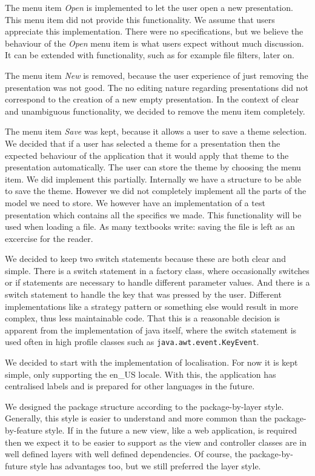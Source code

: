 \documentclass[a4paper]{article}
\begin{document}
The menu item \textit{Open} is implemented to let the user open a new presentation. This menu item did not provide this functionality. We assume that users appreciate this implementation. There were no specifications, but we believe the behaviour of the \textit{Open} menu item is what users expect without much discussion. It can be extended with functionality, such as for example file filters, later on.

The menu item \textit{New} is removed, because the user experience of just removing the presentation was not good. The no editing nature regarding presentations did not correspond to the creation of a new empty presentation. In the context of clear and unambiguous functionality, we decided to remove the menu item completely.

The menu item \textit{Save} was kept, because it allows a user to save a theme selection. We decided that if a user has selected a theme for a presentation then the expected behaviour of the application that it would apply that theme to the presentation automatically. The user can store the theme by choosing the menu item. We did implement this partially. Internally we have a structure to be able to save the theme. However we did not completely implement all the parts of the model we need to store. We however have an implementation of a test presentation which contains all the specifics we made. This functionality will be used when loading a file.
As many textbooks write: saving the file is left as an excercise for the reader.

We decided to keep two switch statements because these are both clear and simple. There is a switch statement in a factory class, where occasionally switches or if statements are necessary to handle different parameter values. And there is a switch statement to handle the key that was pressed by the user. Different implementations like a strategy pattern or something else would result in more complex, thus less maintainable code. That this is a reasonable decision is apparent from the implementation of java itself, where the switch statement is used often in high profile classes such as \texttt{java.awt.event.KeyEvent}.

We decided to start with the implementation of localisation. For now it is kept simple, only supporting the en\_US locale. With this, the application has centralised labels and is prepared for other languages in the future.   

We designed the package structure according to the package-by-layer style. Generally, this style is easier to understand and more common than the package-by-feature style. If in the future a new view, like a web application, is required then we expect it to be easier to support as the view and controller classes are in well defined layers with well defined dependencies. Of course, the package-by-future style has advantages too, but we still preferred the layer style.
\end{document}
